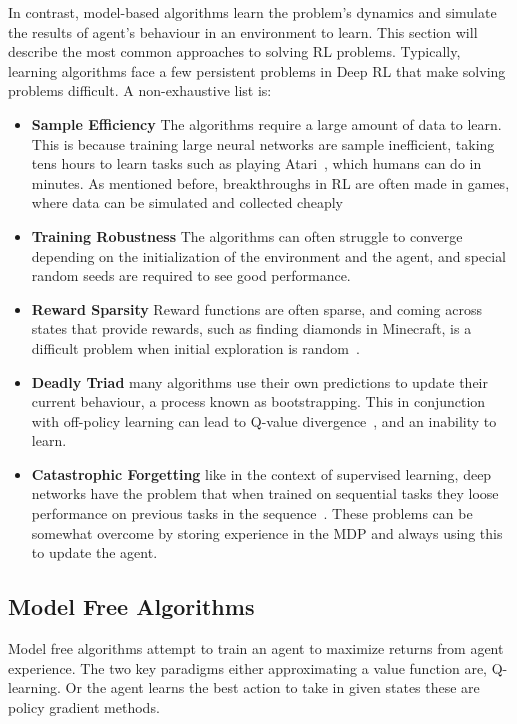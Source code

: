 In contrast, model-based algorithms learn the problem's dynamics and simulate the results of agent's behaviour in an environment to learn. This section will describe the most common approaches to solving RL problems.
Typically, learning algorithms face a few persistent problems in Deep RL that make solving problems difficult. A non-exhaustive list is:
\begin{itemize}
	\item \textbf{Sample Efficiency} The algorithms require a large amount of data to learn. This is because training large neural networks are sample inefficient, taking tens hours to learn tasks such as playing Atari~\cite{hessel2018rainbow}, which humans can do in minutes. As mentioned before, breakthroughs in RL are often made in games, where data can be simulated and collected cheaply\cite{dulac2019challenges}
	\item \textbf{Training Robustness} The algorithms can often struggle to converge depending on the initialization of the environment and the agent, and special random seeds are required to see good performance\cite{henderson2018deep}.
	\item \textbf{Reward Sparsity} Reward functions are often sparse, and coming across states that provide rewards, such as finding diamonds in Minecraft, is a difficult problem when initial exploration is random~\cite{hafner2023mastering}.
	\item \textbf{Deadly Triad} many algorithms use their own predictions to update their current behaviour, a process known as bootstrapping. This in conjunction with off-policy learning can lead to Q-value divergence~\cite{van2018deep}, and an inability to learn.
	\item \textbf{Catastrophic Forgetting} like in the context of supervised learning, deep networks have the problem that when trained on sequential tasks they loose performance on previous tasks in the sequence~\cite{kirkpatrick2017overcoming}. These problems can be somewhat overcome by storing experience in the MDP and always using this to update the agent.

\end{itemize}



\subsection{Model Free Algorithms}
Model free algorithms attempt to train an agent to maximize returns from agent experience. The two key paradigms either approximating a value function are, Q-learning. Or the agent learns the best action to take in given states these are policy gradient methods.

